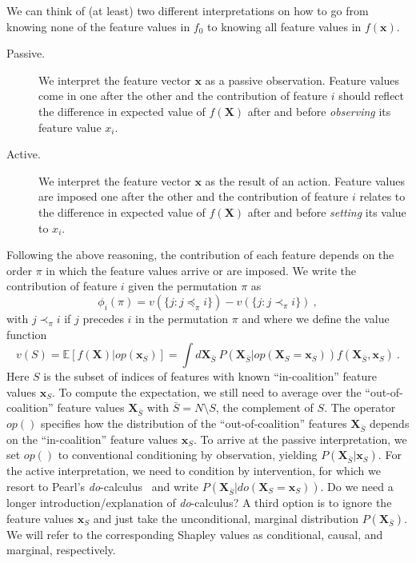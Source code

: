 \documentclass{article}
\newcommand{\vX}{\mathbf{X}}
\newcommand{\vx}{\mathbf{x}}
\newcommand{\expectation}{\mathbb{E}}
\newcommand{\contribution}{{\phi}}
\newcommand{\val}{{v}}
\newcommand{\dodo}{\mathit{do}}
\newcommand{\lvdo}[1]{\dodo(\vX_{#1} = \vx_{#1})}
\newcommand{\perm}{\pi}
\newcommand{\operator}{\mathit{op}}
\newcommand{\svop}[1]{\operator(\vx_{#1})}
\newcommand{\lvop}[1]{\operator(\vX_{#1} = \vx_{#1})}
\newcommand{\allfeatures}{{N}}
\newcommand{\comment}[1]{{\color{red} #1}}
\begin{document}
We can think of (at least) two different interpretations on how to go from knowing none of the feature values in $f_0$ to knowing all feature values in $f(\vx)$.
\begin{description}
	\item[Passive.] We interpret the feature vector $\vx$ as a passive observation. Feature values come in one after the other and the contribution of feature $i$ should reflect the difference in expected value of $f(\vX)$ after and before {\em observing} its feature value $x_i$.
	\item[Active.] We interpret the feature vector $\vx$ as the result of an action. Feature values are imposed one after the other and the contribution of feature $i$ relates to the difference in expected value of $f(\vX)$ after and before {\em setting} its value to $x_i$.
\end{description}
Following the above reasoning, the contribution of each feature  depends on the order $\perm$ in which the feature values arrive or are imposed. We write the contribution of feature $i$ given the permutation $\perm$ as
\begin{equation}
\contribution_i(\perm) = \val(\{j: j \preceq_\perm i\}) - \val(\{j: j \prec_\perm i\}) \: ,
\label{eq:contperm}
\end{equation}
with $j \prec_\perm i$ if $j$ precedes $i$ in the permutation $\perm$ and where we define the value function
\begin{equation}
\val(S) = \expectation \left[f(\vX) | \svop{S} \right] = \int d\vX_{\bar{S}} \: P(\vX_{\bar{S}}|\lvop{S}) f(\vX_{\bar{S}},\vx_S) \: .
\label{eq:valuedef}
\end{equation}
Here $S$ is the subset of indices of features with known ``in-coalition'' feature values $\vx_S$. To compute the expectation, we still need to average over the ``out-of-coalition'' feature values $\vX_{\bar{S}}$ with $\bar{S} = \allfeatures \setminus S$, the complement of $S$. The operator $\operator()$ specifies how the distribution of the ``out-of-coalition'' features $\vX_{\bar{S}}$ depends on the ``in-coalition'' feature values $\vx_{S}$. To arrive at the passive interpretation, we set $\operator()$ to conventional conditioning by observation, yielding $P(\vX_{\bar{S}}|\vx_{S})$. For the active interpretation, we need to condition by intervention, for which we resort to Pearl's \textit{do}-calculus~\cite{pearl1995causal} and write $P(\vX_{\bar{S}}|\lvdo{S})$. \comment{Do we need a longer introduction/explanation of \textit{do}-calculus?} A third option is to ignore the feature values $\vx_S$ and just take the unconditional, marginal distribution $P(\vX_{\bar{S}})$. We will refer to the corresponding Shapley values as conditional, causal, and marginal, respectively.
\end{document}
